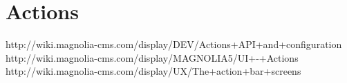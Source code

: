 \section{Actions}
http://wiki.magnolia-cms.com/display/DEV/Actions+API+and+configuration
http://wiki.magnolia-cms.com/display/MAGNOLIA5/UI+-+Actions
http://wiki.magnolia-cms.com/display/UX/The+action+bar+screens